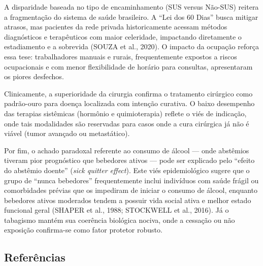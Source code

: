 \documentclass[
]{article}
\newlength{\cslhangindent}
\newenvironment{CSLReferences}[2] %
 {\begin{list}{}{%
  \setlength{\itemindent}{0pt}
  \setlength{\leftmargin}{0pt}
  \setlength{\parsep}{0pt}
  \ifodd #1
   \setlength{\leftmargin}{\cslhangindent}
   \setlength{\itemindent}{-1\cslhangindent}
  \fi
  \setlength{\itemsep}{#2\baselineskip}}}
 {\end{list}}
\begin{document}
A disparidade baseada no tipo de encaminhamento (SUS versus Não-SUS)
reitera a fragmentação do sistema de saúde brasileiro. A ``Lei dos 60
Dias'' busca mitigar atrasos, mas pacientes da rede privada
historicamente acessam métodos diagnósticos e terapêuticos com maior
celeridade, impactando diretamente o estadiamento e a sobrevida (SOUZA
et al., 2020). O impacto da ocupação reforça essa tese: trabalhadores
manuais e rurais, frequentemente expostos a riscos ocupacionais e com
menor flexibilidade de horário para consultas, apresentaram os piores
desfechos.

Clinicamente, a superioridade da cirurgia confirma o tratamento
cirúrgico como padrão-ouro para doença localizada com intenção curativa.
O baixo desempenho das terapias sistêmicas (hormônio e quimioterapia)
reflete o viés de indicação, onde tais modalidades são reservadas para
casos onde a cura cirúrgica já não é viável (tumor avançado ou
metastático).

Por fim, o achado paradoxal referente ao consumo de álcool --- onde
abstêmios tiveram pior prognóstico que bebedores ativos --- pode ser
explicado pelo ``efeito do abstêmio doente'' (\emph{sick quitter
effect}). Este viés epidemiológico sugere que o grupo de ``nunca
bebedores'' frequentemente inclui indivíduos com saúde frágil ou
comorbidades prévias que os impediram de iniciar o consumo de álcool,
enquanto bebedores ativos moderados tendem a possuir vida social ativa e
melhor estado funcional geral (SHAPER et al., 1988; STOCKWELL et al.,
2016). Já o tabagismo mantém sua coerência biológica nociva, onde a
cessação ou não exposição confirma-se como fator protetor robusto.

\subsection{Referências}\label{referuxeancias}

\label{refs}
\begin{CSLReferences}{0}{1}
\end{CSLReferences}
\end{document}
